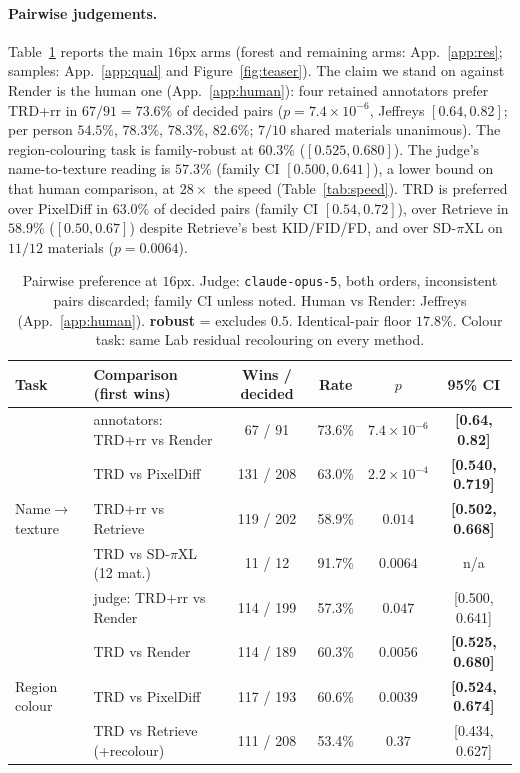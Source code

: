 \documentclass{article}
\newcommand{\trd}{\textsc{TRD}}
\begin{document}
\paragraph{Pairwise judgements.} Table~\ref{tab:judge} reports the main
$16$px arms (forest and remaining arms: App.~\ref{app:res}; samples:
App.~\ref{app:qual} and Figure~\ref{fig:teaser}).
The claim we stand on against Render is the human one
(App.~\ref{app:human}): four retained annotators prefer \trd{}+rr in
$67/91=73.6\%$ of decided pairs ($p=7.4\times10^{-6}$, Jeffreys
$[0.64,0.82]$; per person $54.5\%$, $78.3\%$, $78.3\%$, $82.6\%$;
$7/10$ shared materials unanimous). The region-colouring task is
family-robust at $60.3\%$ ($[0.525,0.680]$). The judge's
name-to-texture reading is $57.3\%$ (family CI $[0.500,0.641]$), a
lower bound on that human comparison, at $28\times$ the speed
(Table~\ref{tab:speed}). \trd{} is preferred over PixelDiff in
$63.0\%$ of decided pairs (family CI $[0.54,0.72]$), over Retrieve
in $58.9\%$ ($[0.50,0.67]$) despite Retrieve's best KID/FID/FD, and
over SD-$\pi$XL on $11/12$ materials ($p=0.0064$).

\begin{table}[t]
\caption{Pairwise preference at $16$px. Judge: \texttt{claude-opus-5}, both
orders, inconsistent pairs discarded; family CI unless noted.
Human vs Render: Jeffreys (App.~\ref{app:human}).
\textbf{robust} = excludes $0.5$. Identical-pair floor $17.8\%$.
Colour task: same Lab residual recolouring on every method.}
\label{tab:judge}
\centering
\small\setlength{\tabcolsep}{4.5pt}
\begin{tabular}{@{}llcccc@{}}
\toprule
Task & Comparison (first wins) & Wins / decided & Rate & $p$ & 95\% CI \\
\midrule
\multirow{5}{*}{Name$\to$texture}
 & annotators: \trd{}+rr vs Render & 67 / 91 & 73.6\% & $7.4\times10^{-6}$ & \textbf{[0.64, 0.82]} \\
 & \trd{} vs PixelDiff & 131 / 208 & 63.0\% & $2.2\times10^{-4}$ & \textbf{[0.540, 0.719]} \\
 & \trd{}+rr vs Retrieve & 119 / 202 & 58.9\% & $0.014$ & \textbf{[0.502, 0.668]} \\
 & \trd{} vs SD-$\pi$XL (12 mat.) & 11 / 12 & 91.7\% & $0.0064$ & n/a \\
 & judge: \trd{}+rr vs Render & 114 / 199 & 57.3\% & $0.047$ & [0.500, 0.641] \\
\midrule
\multirow{3}{*}{Region colour}
 & \trd{} vs Render & 114 / 189 & 60.3\% & $0.0056$ & \textbf{[0.525, 0.680]} \\
 & \trd{} vs PixelDiff & 117 / 193 & 60.6\% & $0.0039$ & \textbf{[0.524, 0.674]} \\
 & \trd{} vs Retrieve (+recolour) & 111 / 208 & 53.4\% & $0.37$ & [0.434, 0.627] \\
\bottomrule
\end{tabular}
\end{table}
\end{document}
